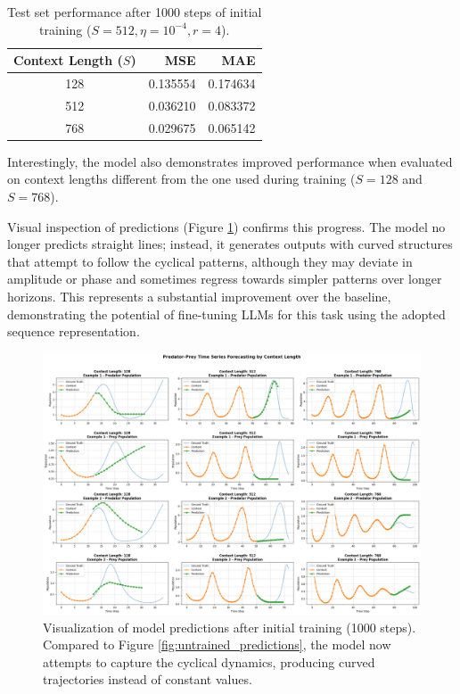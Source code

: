 \documentclass{article}
\begin{document}
\begin{table}[!htbp] %
\renewcommand{\arraystretch}{1.4}
\centering
\setlength{\tabcolsep}{8pt} 
\begin{tabular}{crr}
    \toprule
    \textbf{Context Length ($S$)} & \textbf{MSE} & \textbf{MAE} \\
    \midrule
    128 & 0.135554 & 0.174634 \\
    512 & 0.036210 & 0.083372 \\
    768 & 0.029675 & 0.065142 \\
    \bottomrule
\end{tabular}
\caption{Test set performance after 1000 steps of initial training ($S=512, \eta=10^{-4}, r=4$).} 
\label{tab:initial_training_metrics} 
\end{table}

Interestingly, the model also demonstrates improved performance when evaluated on context lengths different from the one used during training ($S=128$ and $S=768$). 

Visual inspection of predictions (Figure \ref{fig:initial_training_predictions}) confirms this progress. The model no longer predicts straight lines; instead, it generates outputs with curved structures that attempt to follow the cyclical patterns, although they may deviate in amplitude or phase and sometimes regress towards simpler patterns over longer horizons. This represents a substantial improvement over the baseline, demonstrating the potential of fine-tuning LLMs for this task using the adopted sequence representation.

\begin{figure}[!htbp] %
    \centering
    \includegraphics[width=0.9\linewidth]{M2 Course Work//Images/intial_training_result.png} %
    \caption{Visualization of model predictions after initial training (1000 steps). Compared to Figure \ref{fig:untrained_predictions}, the model now attempts to capture the cyclical dynamics, producing curved trajectories instead of constant values.}
    \label{fig:initial_training_predictions} %
\end{figure}
\end{document}
